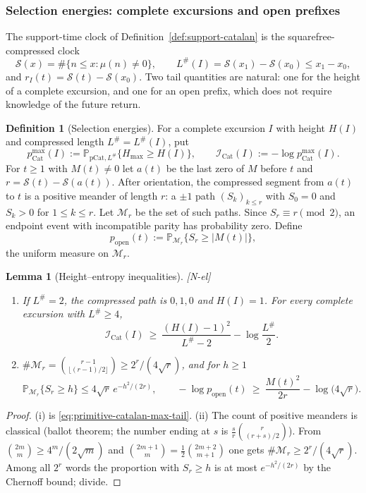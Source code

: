 \documentclass[11pt]{amsart}
\numberwithin{equation}{section}
\theoremstyle{plain}
\newtheorem{lemma}[theorem]{Lemma}
\theoremstyle{definition}
\newtheorem{definition}[theorem]{Definition}
\theoremstyle{remark}
\newcommand{\Sq}{\mathcal{S}}
\newcommand{\tagNE}{\textup{[N-el]}}
\begin{document}
\subsubsection*{Selection energies: complete excursions and open prefixes}

The support-time clock of Definition~\ref{def:support-catalan} is the
squarefree-compressed clock
\[
\Sq(x)=\#\{n\le x:\mu(n)\ne0\},\qquad L^\#(I)=\Sq(x_1)-\Sq(x_0)\le x_1-x_0,
\]
and $r_I(t)=\Sq(t)-\Sq(x_0)$. Two tail quantities are natural: one for the
height of a complete excursion, and one for an open prefix, which does not
require knowledge of the future return.

\begin{definition}[Selection energies]
\label{def:selection-energies}
For a complete excursion $I$ with height $H(I)$ and compressed length
$L^\#=L^\#(I)$, put
\[
p^{\max}_{\mathrm{Cat}}(I):=\mathbb P_{\mathrm{pCat},L^\#}\{H_{\max}\ge H(I)\},
\qquad
\mathcal I_{\mathrm{Cat}}(I):=-\log p^{\max}_{\mathrm{Cat}}(I).
\]
For $t\ge1$ with $M(t)\ne0$ let $a(t)$ be the last zero of $M$ before $t$ and
$r=\Sq(t)-\Sq(a(t))$. After orientation, the compressed segment from $a(t)$ to
$t$ is a positive meander of length $r$: a $\pm1$ path $(S_k)_{k\le r}$ with
$S_0=0$ and $S_k>0$ for $1\le k\le r$. Let $\mathcal M_r$ be the set of such
paths.  Since $S_r\equiv r\pmod 2$, an endpoint event with incompatible
parity has probability zero.  Define
\[
p_{\mathrm{open}}(t):=\mathbb P_{\mathcal M_r}\{S_r\ge|M(t)|\},
\]
the uniform measure on $\mathcal M_r$.
\end{definition}

\begin{lemma}[Height--entropy inequalities]
\label{lem:height-entropy}
\tagNE\ \begin{enumerate}[label=\textup{(\roman*)}]
\item If $L^\#=2$, the compressed path is $0,1,0$ and $H(I)=1$. For every
complete excursion with $L^\#\ge4$,
\[
\mathcal I_{\mathrm{Cat}}(I)\ \ge\ \frac{(H(I)-1)^2}{L^\#-2}-\log\frac{L^\#}2 .
\]
\item $\#\mathcal M_r=\binom{r-1}{\lfloor(r-1)/2\rfloor}\ge2^r/(4\sqrt r)$,
and for $h\ge1$
\[
\mathbb P_{\mathcal M_r}\{S_r\ge h\}\le4\sqrt r\,e^{-h^2/(2r)},
\qquad
-\log p_{\mathrm{open}}(t)\ \ge\ \frac{M(t)^2}{2r}-\log\bigl(4\sqrt r\bigr).
\]
\end{enumerate}
\end{lemma}

\begin{proof}
(i) is \eqref{eq:primitive-catalan-max-tail}. (ii) The count of positive
meanders is classical (ballot theorem; the number ending at $s$ is
$\frac sr\binom{r}{(r+s)/2}$). From
$\binom{2m}{m}\ge4^m/(2\sqrt m)$ and
$\binom{2m+1}{m}=\frac12\binom{2m+2}{m+1}$ one gets
$\#\mathcal M_r\ge2^r/(4\sqrt r)$. Among all $2^r$ words the proportion with
$S_r\ge h$ is at most $e^{-h^2/(2r)}$ by the Chernoff bound; divide.
\end{proof}
\end{document}
